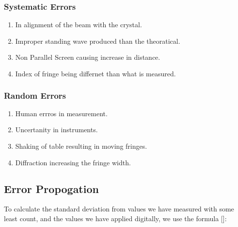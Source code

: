 \documentclass[%
sor,
 jor,
 amsmath,amssymb,
 reprint,
longbibliography,
]{revtex4-2}
\begin{document}
\noindent %
\begin{minipage}[t]{0.48\textwidth}
\subsubsection{Systematic Errors}
\begin{enumerate}
	\item In alignment of the beam with the crystal.
	\item Improper standing wave produced than the theoratical.
	\item Non Parallel Screen causing increase in distance.
	\item Index of fringe being differnet than what is measured. 
\end{enumerate}
\end{minipage}
\hfill %
\begin{minipage}[t]{0.48\textwidth}
\subsubsection{Random Errors}
\begin{enumerate}
	\item Human errros in measurement.
	\item Uncertanity in instruments.
	\item Shaking of table resulting in moving fringes.
	\item Diffraction increasing the fringe width.
\end{enumerate}
\end{minipage}

\subsection{Error Propogation}
To calculate the standard deviation from values we have measured with some least count, and the values we have applied digitally, we use the formula [\cite{tewari_uncertainty}]: 
\end{document}
